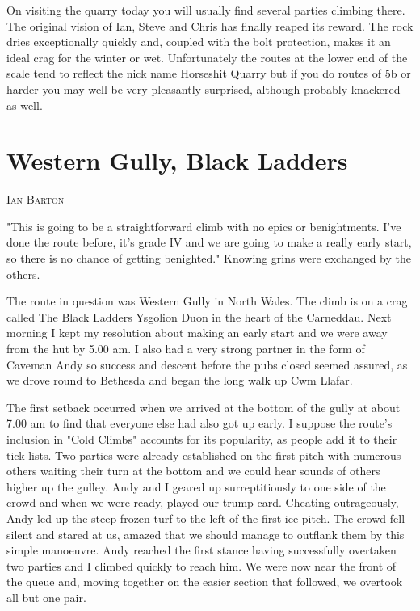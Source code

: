 \documentclass[a5paper,openany,font 10pt]{scrbook}
\makeatletter
\newcommand{\chapterauthor}[1]{%
{\parindent0pt\vspace*{-5pt}%
\linespread{1.1}\large\scshape#1%
\par\nobreak\vspace*{35pt}}
\@afterheading%
}
\makeatother
\begin{document}
On visiting the quarry today you will usually find several
parties climbing there. The original vision of Ian, Steve and
Chris has finally reaped its reward. The rock dries exceptionally
quickly and, coupled with the bolt protection, makes it an ideal
crag for the winter or wet. Unfortunately the routes at the lower
end of the scale tend to reflect the nick name Horseshit Quarry
but if you do routes of 5b or harder you may well be very
pleasantly surprised, although probably knackered as well.

\chapter{Western Gully, Black Ladders}
\label{sec:org45870fd}
\chapterauthor{Ian Barton}

"This is going to be a straightforward climb with no epics
or benightments. I've done the route before, it's grade IV and we
are going to make a really early start, so there is no chance of
getting benighted." Knowing grins were exchanged by the others.

The route in question was  Western Gully  in North Wales. The
climb is on a crag called  The Black Ladders  Ysgolion Duon  in
the heart of the Carneddau. Next morning I kept my resolution
about making an early start and we were away from the hut by
5.00 am. I also had a very strong partner in the form of Caveman
 Andy  so success and descent before the pubs closed seemed
assured, as we drove round to Bethesda and began the long walk up
Cwm Llafar.

The first setback occurred when we arrived at the bottom of
the gully at about 7.00 am to find that everyone else had also
got up early. I suppose the route's inclusion in "Cold Climbs"
accounts for its popularity, as people add it to their tick
lists. Two parties were already established on the first pitch
with numerous others waiting their turn at the bottom and we
could hear sounds of others higher up the gulley. Andy and I
geared up surreptitiously to one side of the crowd and when we
were ready, played our trump card. Cheating outrageously, Andy
led up the steep frozen turf to the left of the first ice pitch.
The crowd fell silent and stared at us, amazed that we should
manage to outflank them by this simple manoeuvre. Andy reached
the first stance having successfully overtaken two parties and I
climbed quickly to reach him. We were now near the front of the
queue and, moving together on the easier section that followed,
we overtook all but one pair.
\end{document}
